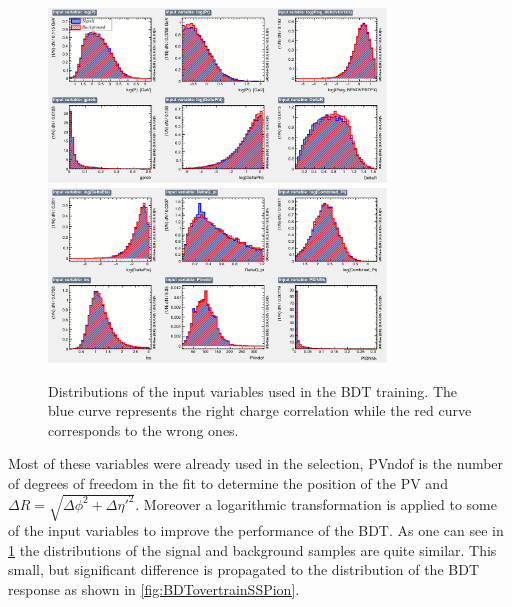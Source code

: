 \begin{figure}[tbp]
	\begin{center}
		\includegraphics[width=0.8\textwidth]{08FlavourTagging/figs/SSpionBDT_input1.pdf}\\
		\includegraphics[width=0.8\textwidth]{08FlavourTagging/figs/SSpionBDT_input2.pdf}
	\end{center}
	\caption{Distributions of the input variables used in the BDT training.
	The blue curve represents the right charge correlation while the red curve corresponds to the wrong ones.}
	\label{fig:BDTInputSSPion}
\end{figure}
Most of these variables were already used in the selection, PVndof is the number of degrees of freedom in the fit to determine the position of the \ac{PV} and $\Delta R=\sqrt{\Delta\phi^2+\Delta\eta'^2}$.
Moreover a logarithmic transformation is applied to some of the input variables to improve the performance of the BDT.
As one can see in \cref{fig:BDTInputSSPion} the distributions of the signal and background samples are quite similar.
This small, but significant difference is propagated to the distribution of the BDT response as shown in \cref{fig:BDTovertrainSSPion}.
